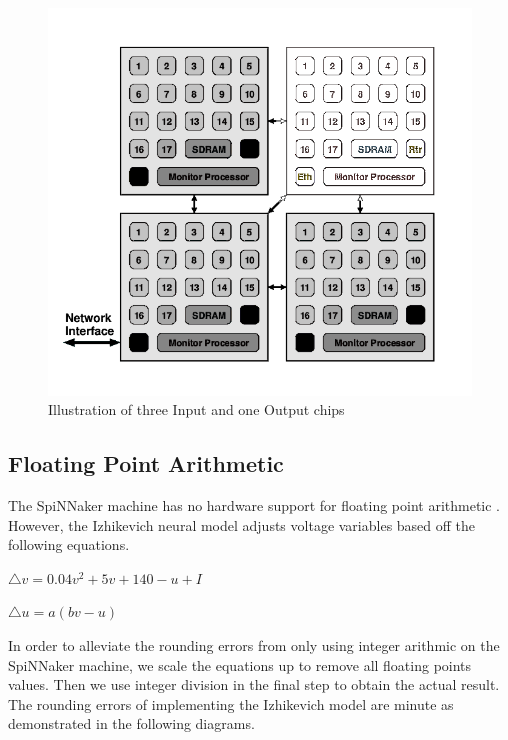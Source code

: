 \documentclass[journal]{./sty/IEEEtran}
\begin{document}
\begin{figure}
\centering
\includegraphics[scale=0.3]{imgs/SpiNN4IO.png}
\caption{Illustration of three Input and one Output chips\label{spinnIO}}
\end{figure}


\subsection{Floating Point Arithmetic}
The SpiNNaker machine has no hardware support for floating point arithmetic \cite{ArchOverV:Furber}. 
However, the Izhikevich neural model adjusts voltage variables based off the following equations.

\begin{math}
\triangle v = 0.04 v^2 + 5 v  + 140 - u + I
\end{math}

\begin{math}
\triangle u = a(b v - u)
\end{math}

In order to alleviate the rounding errors from only using integer arithmic on the SpiNNaker machine, 
we scale the equations up to remove all floating points values. 
Then we use integer division in the final step to obtain the actual result.
The rounding errors of implementing the Izhikevich model are minute as demonstrated in the following diagrams.
\end{document}
